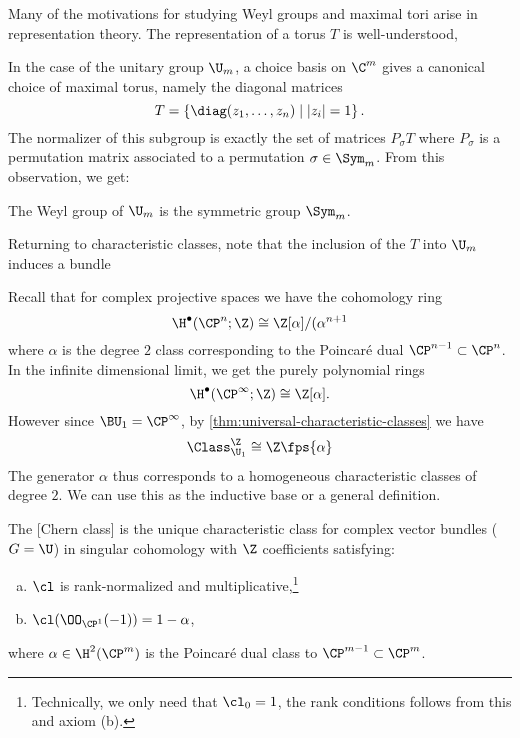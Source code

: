 \begin{remark}
	Many of the motivations for studying Weyl groups and maximal tori arise in representation theory. The representation of a torus $T$ is well-understood, 
\end{remark}

In the case of the unitary group $\U_m$, a choice basis on $\C^m$ gives a canonical choice of maximal torus, namely the diagonal matrices
\[
	T = \left\{\diag(z_1,\ldots, z_n) \mid |z_i|=1\right\}.
\]
The normalizer of this subgroup is exactly the set of matrices $P_\sigma T$ where $P_\sigma$ is a permutation matrix associated to a permutation $\sigma\in \Sym_m$. From this observation, we get:
\begin{proposition}
	The Weyl group of $\U_m$ is the symmetric group $\Sym_m$.
\end{proposition}

Returning to characteristic classes, note that the inclusion of the $T$ into $\U_m$ induces a bundle

\pagebreak

Recall that for complex projective spaces we have the cohomology ring
\[
	\H^\bullet(\CP^n;\Z)\cong \Z[\alpha]/(\alpha^{n+1}
\]
where $\alpha$ is the degree $2$ class corresponding to the Poincar\'e dual $\CP^{n-1}\subset \CP^n$.
In the infinite dimensional limit, we get the purely polynomial rings
\[
	\H^\bullet(\CP^\infty;\Z)\cong \Z[\alpha].
\]
However since $\BU_1=\CP^\infty$, by \cref{thm:universal-characteristic-classes} we have
\begin{equation}\label{eq:cczu1-a}
	\Class_{\U_1}^{\Z}\cong \Z\fps{\alpha}
\end{equation}
The generator $\alpha$ thus corresponds to a homogeneous characteristic classes of degree $2$. We can use this as the inductive base or a general definition.

\begin{proposition}
	The [Chern class] is the unique characteristic class for complex vector bundles ($G=\U$) in singular cohomology with $\Z$ coefficients satisfying:
	\begin{enumerate}[(a)]
		\item $\cl$ is rank-normalized and multiplicative,\footnote{Technically, we only need that $\cl_0=1$, the rank conditions follows from this and axiom (b).}
		\item $\cl(\OO_{\CP^1}(-1))=1-\alpha$,
	\end{enumerate}
	where $\alpha\in \H^2(\CP^m)$ is the Poincar\'e dual class to $\CP^{m-1}\subset \CP^m$.
\end{proposition}

